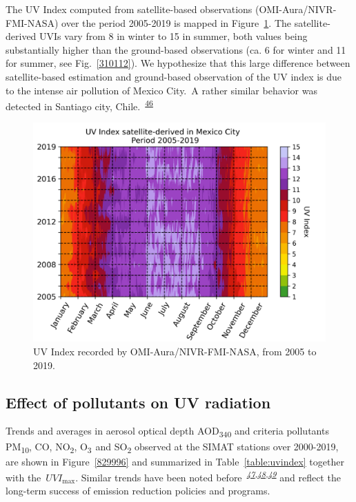 \documentclass[10pt]{article}
\begin{document}
The UV Index computed from satellite-based observations
(OMI-Aura/NIVR-FMI-NASA) over the period 2005-2019 is mapped in
Figure~{\ref{485116}}. The satellite-derived UVIs vary
from 8 in winter to 15 in summer, both values being substantially higher
than the ground-based observations (ca. 6 for winter and 11 for summer,
see Fig.~{\ref{310112}}). We hypothesize that this
large difference between satellite-based estimation and ground-based
observation of the UV index is due to the intense air pollution of
Mexico City.~A rather similar behavior was detected in Santiago city,
Chile.~\textsuperscript{\hyperref[csl:46]{46}}
\begin{figure}[H]
\begin{center}
\includegraphics[width=0.70\columnwidth]{figures/UVI-OMI/UVI-OMI}
\caption{{UV Index recorded by OMI-Aura/NIVR-FMI-NASA, from 2005 to 2019.
{\label{485116}}%
}}
\end{center}
\end{figure}

\subsection*{Effect of pollutants on UV
radiation}

{\label{884442}}

Trends and averages in aerosol optical depth AOD\textsubscript{340} and
criteria pollutants PM\textsubscript{10}, CO, NO\textsubscript{2},
O\textsubscript{3~}and SO\textsubscript{2} observed at the SIMAT
stations over 2000-2019, are shown in
Figure~{\ref{829996}} and summarized in
Table~{\ref{table:uvindex}} together with
the~\(UVI_{\max}\). Similar trends have been noted
before~\emph{\textsuperscript{\hyperref[csl:47]{47},\hyperref[csl:48]{48},\hyperref[csl:49]{49}}} and reflect the long-term success of
emission reduction policies and programs.
\end{document}
